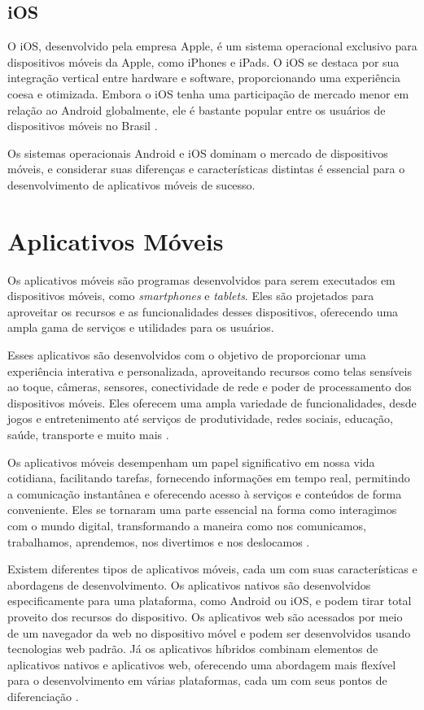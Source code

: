 \documentclass[
    12pt,                   %
    openright,              %
    oneside,                %
    a4paper,                %
    sumario=tradicional,    %
    english,                %
    brazil,                 %
    ]{abntex2}
\begin{document}
\subsection{iOS}
\label{subsubsec:ios}

O iOS, desenvolvido pela empresa Apple, é um sistema operacional exclusivo para dispositivos móveis da Apple, como iPhones e iPads. O iOS se destaca por sua integração vertical entre hardware e software, proporcionando uma experiência coesa e otimizada. Embora o iOS tenha uma participação de mercado menor em relação ao Android globalmente, ele é bastante popular entre os usuários de dispositivos móveis no Brasil \cite{statcounter-br}.

Os sistemas operacionais Android e iOS dominam o mercado de dispositivos móveis, e considerar suas diferenças e características distintas é essencial para o desenvolvimento de aplicativos móveis de sucesso.


\section{Aplicativos Móveis}
\label{sec:aplicativos-moveis}
Os aplicativos móveis são programas desenvolvidos para serem executados em dispositivos móveis, como \textit{ smartphones} e \textit{tablets}. Eles são projetados para aproveitar os recursos e as funcionalidades desses dispositivos, oferecendo uma ampla gama de serviços e utilidades para os usuários.

Esses aplicativos são desenvolvidos com o objetivo de proporcionar uma experiência interativa e personalizada, aproveitando recursos como telas sensíveis ao toque, câmeras, sensores, conectividade de rede e poder de processamento dos dispositivos móveis. Eles oferecem uma ampla variedade de funcionalidades, desde jogos e entretenimento até serviços de produtividade, redes sociais, educação, saúde, transporte e muito mais \cite{aplicativosmoveis}.

Os aplicativos móveis desempenham um papel significativo em nossa vida cotidiana, facilitando tarefas, fornecendo informações em tempo real, permitindo a comunicação instantânea e oferecendo acesso à serviços e conteúdos de forma conveniente. Eles se tornaram uma parte essencial na forma como interagimos com o mundo digital, transformando a maneira como nos comunicamos, trabalhamos, aprendemos, nos divertimos e nos deslocamos \cite{aplicativosmoveis}.

Existem diferentes tipos de aplicativos móveis, cada um com suas características e abordagens de desenvolvimento. Os aplicativos nativos são desenvolvidos especificamente para uma plataforma, como Android ou iOS, e podem tirar total proveito dos recursos do dispositivo. Os aplicativos web são acessados por meio de um navegador da web no dispositivo móvel e podem ser desenvolvidos usando tecnologias web padrão. Já os aplicativos híbridos combinam elementos de aplicativos nativos e aplicativos web, oferecendo uma abordagem mais flexível para o desenvolvimento em várias plataformas, cada um com seus pontos de diferenciação \cite{accurate-nativexmult}.
\end{document}
